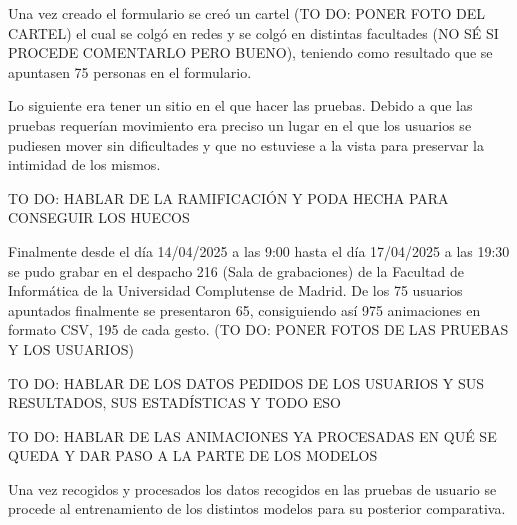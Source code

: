 Una vez creado el formulario se creó un cartel (TO DO: PONER FOTO DEL CARTEL) el cual se colgó en redes y se colgó en distintas facultades (NO SÉ SI PROCEDE COMENTARLO PERO BUENO), teniendo como resultado que se apuntasen 75 personas en el formulario.

Lo siguiente era tener un sitio en el que hacer las pruebas. Debido a que las pruebas requerían movimiento era preciso un lugar en el que los usuarios se pudiesen mover sin dificultades y que no estuviese a la vista para preservar la intimidad de los mismos.

TO DO: HABLAR DE LA RAMIFICACIÓN Y PODA HECHA PARA CONSEGUIR LOS HUECOS

Finalmente desde el día 14/04/2025 a las 9:00 hasta el día 17/04/2025 a las 19:30 se pudo grabar en el despacho 216 (Sala de grabaciones) de la Facultad de Informática de la Universidad Complutense de Madrid.
De los 75 usuarios apuntados finalmente se presentaron 65, consiguiendo así 975 animaciones en formato CSV, 195 de cada gesto. (TO DO: PONER FOTOS DE LAS PRUEBAS Y LOS USUARIOS)

TO DO: HABLAR DE LOS DATOS PEDIDOS DE LOS USUARIOS Y SUS RESULTADOS, SUS ESTADÍSTICAS Y TODO ESO

TO DO: HABLAR DE LAS ANIMACIONES YA PROCESADAS EN QUÉ SE QUEDA Y DAR PASO A LA PARTE DE LOS MODELOS

Una vez recogidos y procesados los datos recogidos en las pruebas de usuario se procede al entrenamiento de los distintos modelos para su posterior comparativa.